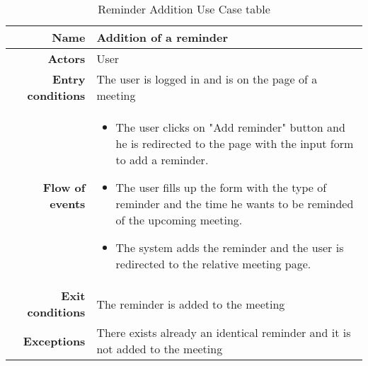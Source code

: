 \begin{table}[htp]
\begin{tabular}{r|p{7cm}}
\bf\large Name&\bf\large Addition of a reminder\\
\hline
\hline
\bf Actors&User\\
\hline
\bf Entry conditions&The user is logged in and is on the page of a meeting\\
\hline
\bf Flow of events&
\begin{itemize}
\item The user clicks on "Add reminder" button and he is redirected to the page with the input form to add a reminder.

\item The user fills up the form with the type of reminder and the time he wants to be reminded of the upcoming meeting.

\item  The system adds the reminder and the user is redirected to the relative meeting page.

\end{itemize}
\\
\hline
\bf Exit conditions&The reminder is added to the meeting \\
\hline
\bf Exceptions&There exists already an identical reminder and it is not added to the meeting\\
\hline

\end{tabular}
\caption{Reminder Addition Use Case table} \label{tab:reminderaddition}
\end{table}